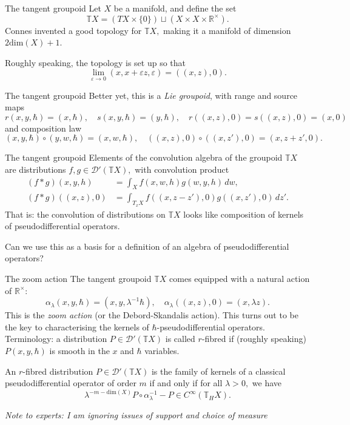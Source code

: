 \documentclass{beamer}
\numberwithin{equation}{section}
\theoremstyle{plain}
\theoremstyle{plain}
\theoremstyle{definition}
\theoremstyle{plain}
\theoremstyle{plain}
\theoremstyle{definition}
\newcommand{\Rl}{\mathbb{R}}
\newcommand{\Dc}{\mathcal{D}}
\newcommand{\Tb}{\mathbb{T}}
\begin{document}
\begin{frame}{The tangent groupoid}
  Let $X$ be a manifold, and define the set
  \[
    \mathbb{T}X = (TX\times \{0\})\sqcup (X\times X\times \Rl^{\times}).
  \]
  Connes invented a good topology for $\mathbb{T}X,$ making it a manifold of dimension $2\mathrm{dim}(X)+1.$

  Roughly speaking, the topology is set up so that
  \[
    \lim_{\varepsilon\to 0} (x,x+\varepsilon z,\varepsilon) = ((x,z),0).
  \]
\end{frame}

\begin{frame}{The tangent groupoid}
  Better yet, this is a \emph{Lie groupoid}, with range and source maps
  \[
    r(x,y,\hbar) = (x,\hbar),\quad s(x,y,\hbar) = (y,\hbar),\quad r((x,z),0) = s((x,z),0) = (x,0)
  \]
  and composition law
  \[
    (x,y,\hbar)\circ (y,w,\hbar) = (x,w,\hbar),\quad ((x,z),0)\circ ((x,z'),0) = (x,z+z',0).
  \]
\end{frame}

\begin{frame}{The tangent groupoid}
  Elements of the convolution algebra of the groupoid $\mathbb{T}X$ are distributions $f,g \in \Dc'(\mathbb{T}X),$ with convolution product
  \begin{align*}
    (f\ast g)(x,y,h) &= \int_{X} f(x,w,h)g(w,y,h)\,dw,\\
    (f\ast g)((x,z),0) &=\int_{T_xX} f((x,z-z'),0)g((x,z'),0)\,dz'.
  \end{align*}
  That is: the convolution of distributions on $\mathbb{T}X$ looks like composition of kernels of pseudodifferential operators.

  Can we use this as a basis for a definition of an algebra of pseudodifferential operators?
\end{frame}

\begin{frame}{The zoom action}
  The tangent groupoid $\Tb X$ comes equipped with a natural action of $\Rl^{\times}:$
  \[
    \alpha_{\lambda}(x,y,\hbar) = (x,y,\lambda^{-1} \hbar),\quad \alpha_{\lambda}((x,z),0) = (x,\lambda z).
  \]
  This is the \emph{zoom action} (or the Debord-Skandalis action).
  This turns out to be the key to characterising the kernels of $\hbar$-pseudodifferential operators.
  Terminology: a distribution $P\in \Dc'(\Tb X)$ is called $r$-fibred if (roughly speaking) $P(x,y,\hbar)$ is smooth in the $x$ and $\hbar$ variables.
  \begin{theorem}
    An $r$-fibred distribution $P\in \Dc'(\Tb X)$ is the family of kernels of a classical pseudodifferential operator of order $m$ if and only if for all $\lambda>0,$ we have
    \[
      \lambda^{-m-\mathrm{dim}(X)}P\circ \alpha_{\lambda}^{-1}-P \in C^\infty(\Tb_H X).
    \]
  \end{theorem}
  \emph{Note to experts: I am ignoring issues of support and choice of measure}
\end{frame}
\end{document}
